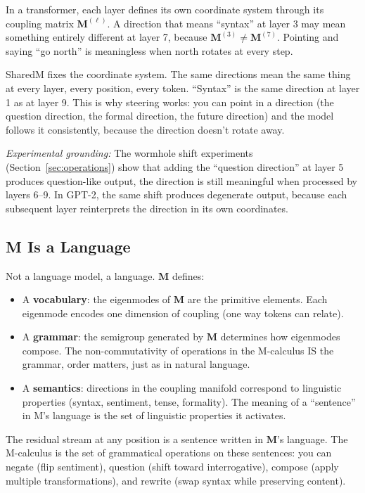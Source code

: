 \documentclass[11pt, a4paper]{article}
\newcommand{\M}{\mathbf{M}}
\theoremstyle{plain}
\theoremstyle{definition}
\theoremstyle{remark}
\begin{document}
In a transformer, each layer defines its own coordinate system through its coupling matrix $\M^{(\ell)}$.
A direction that means ``syntax'' at layer 3 may mean something entirely different at layer 7, because $\M^{(3)} \neq \M^{(7)}$.
Pointing and saying ``go north'' is meaningless when north rotates at every step.

SharedM fixes the coordinate system.
The same directions mean the same thing at every layer, every position, every token.
``Syntax'' is the same direction at layer 1 as at layer 9.
This is why steering works: you can point in a direction (the question direction, the formal direction, the future direction) and the model follows it consistently, because the direction doesn't rotate away.

\emph{Experimental grounding:}
The wormhole shift experiments (Section~\ref{sec:operations}) show that adding the ``question direction'' at layer 5 produces question-like output, the direction is still meaningful when processed by layers 6--9.
In GPT-2, the same shift produces degenerate output, because each subsequent layer reinterprets the direction in its own coordinates.

\subsection{M Is a Language}

Not a language model, a language.
$\M$ defines:
\begin{itemize}[nosep]
\item A \textbf{vocabulary}: the eigenmodes of $\M$ are the primitive elements. Each eigenmode encodes one dimension of coupling (one way tokens can relate).
\item A \textbf{grammar}: the semigroup generated by $\M$ determines how eigenmodes compose. The non-commutativity of operations in the M-calculus IS the grammar, order matters, just as in natural language.
\item A \textbf{semantics}: directions in the coupling manifold correspond to linguistic properties (syntax, sentiment, tense, formality). The meaning of a ``sentence'' in M's language is the set of linguistic properties it activates.
\end{itemize}

The residual stream at any position is a sentence written in $\M$'s language.
The M-calculus is the set of grammatical operations on these sentences: you can negate (flip sentiment), question (shift toward interrogative), compose (apply multiple transformations), and rewrite (swap syntax while preserving content).
\end{document}
